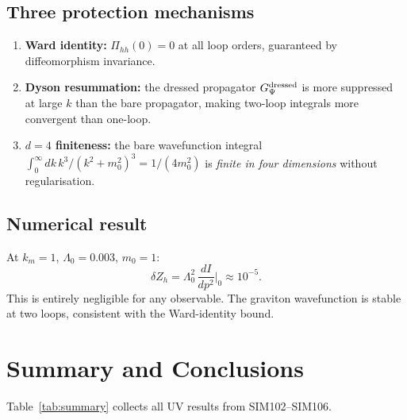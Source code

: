 \documentclass[12pt,a4paper]{article}
\begin{document}
\subsection{Three protection mechanisms}

\begin{enumerate}
\item \textbf{Ward identity:} $\Pi_{hh}(0)=0$ at all loop orders,
      guaranteed by diffeomorphism invariance.
\item \textbf{Dyson resummation:} the dressed propagator
      $G_\Psi^{\rm dressed}$ is more suppressed at large $k$ than the
      bare propagator, making two-loop integrals more convergent than
      one-loop.
\item \textbf{$d=4$ finiteness:} the bare wavefunction integral
      $\int_0^\infty dk\,k^3/(k^2+m_0^2)^3 = 1/(4m_0^2)$ is
      \emph{finite in four dimensions} without regularisation.
\end{enumerate}

\subsection{Numerical result}

At $k_m=1$, $\Lambda_0=0.003$, $m_0=1$:
\begin{equation}
\delta Z_h = \Lambda_0^2\,\frac{dI}{dp^2}\bigg|_0
\approx 10^{-5}.
\end{equation}
This is entirely negligible for any observable.  The graviton
wavefunction is stable at two loops, consistent with the Ward-identity
bound.

\section{Summary and Conclusions}
\label{sec:conclusions}

Table~\ref{tab:summary} collects all UV results from SIM102–SIM106.
\end{document}
